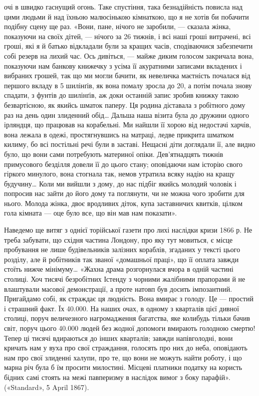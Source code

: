 \parcont{}  %
очі в швидко гаснущий огонь. Таке спустіння, така безнадійність
повисла над цими людьми й над їхньою малюсінькою кімнаткою,
що я не хотів би побачити подібну сцену ще раз. «Вони,
пане, нічого не заробили, — сказала жінка, показуючи на своїх
дітей, — нічого за 26 тижнів, і всі наші гроші витрачені, всі гроші,
які я й батько відкладали були за кращих часів, сподіваючися
забезпечити собі резерв на лихий час. Ось дивіться, — майже
диким голосом закричала вона, показуючи нам банкову книжечку
з усіма її акуратними записами вкладених і вибраних грошей,
так що ми могли бачити, як невеличка маєтність почалася
від першого вкладу в 5 шилінґів, як вона помалу зросла до
20, а потім почала знову спадати, з фунтів до
шилінґів, аж доки останній запис зробив книжку такою безвартісною,
як якийсь шматок паперу. Ця родина діставала з робітного
дому раз на день один злиденний обід\dots{} Дальша наша візита
була до дружини одного ірляндця, що працював на корабельні.
Ми найшли її хорою від недостачі харчів, вона лежала в одежі,
простягнувшись на матраці, ледве прикрита шматком килиму,
бо всі постільні речі були в заставі. Нещасні діти доглядали її,
але видно було, що вони сами потребують материної опіки.
Дев’ятнадцять тижнів примусового безділля довели її до цього
стану; оповідаючи нам історію свого гіркого минулого, вона
стогнала так, немов утратила всяку надію на кращу будучину\dots{}
Коли ми вийшли з дому, до нас підбіг якийсь молодий чоловік
і попросив нас зайти до його дому та поглянути, чи не можна
чого зробити для нього. Молода жінка, двоє вродливих діток,
купа заставничих квитків, цілком гола кімната — оце було все,
що він мав нам показати».

Наведемо ще витяг з однієї торійської газети про лихі наслідки
кризи 1866 р. Не треба забувати, що східня частина Лондону,
про яку тут мовиться, є місце пробування не лише будівельників
залізних кораблів, згаданих у тексті цього розділу, але й
робітників так званої «домашньої праці», що її оплата завжди
стоїть нижче мінімуму\dots{} «Жахна драма розгорнулася вчора в
одній частині столиці. Хоч тисячі безробітних Істенду з чорними
жалібними прапорами й не влаштували масової демонстрації,
а проте натовп був досить імпозантний. Пригайдамо собі, як
страждає ця людність. Вона вмирає з голоду. Це — простий і
страшний факт. Їх \num{40.000}. На наших очах, в одному з кварталів
цієї дивної столиці, поруч величезного нагромадження багатства,
яке колибудь тільки бачив світ, поруч цього \num{40.000} людей без
жодної допомоги вмирають голодною смертю! Тепер ці тисячі
вдираються до інших кварталів; завжди напівголодні, вони кричать
нам у вуха про свої страждання, голосять про них до
неба, оповідають нам про свої злиденні халупи, про те, що вони
не можуть найти роботу, і що марна річ була б їм просити
милостині. Місцеві платники податку на користь бідних самі
стоять на межі павперизму в наслідок вимог з боку парафій».
(«Standard», 5 April 1867).
